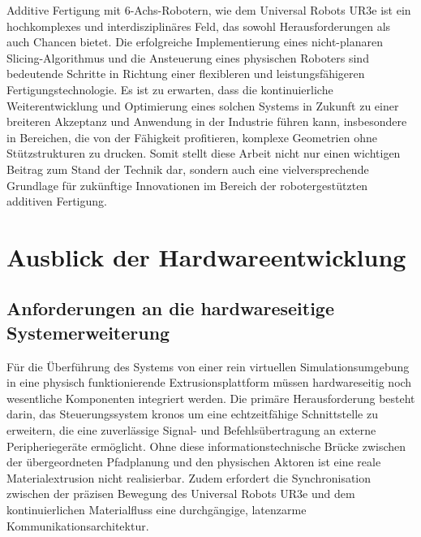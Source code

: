         Additive Fertigung mit 6-Achs-Robotern, wie dem Universal Robots UR3e ist ein hochkomplexes und interdisziplinäres Feld, das sowohl Herausforderungen als auch Chancen bietet.
        Die erfolgreiche Implementierung eines nicht-planaren Slicing-Algorithmus und die Ansteuerung eines physischen Roboters sind bedeutende Schritte in Richtung einer flexibleren und leistungsfähigeren Fertigungstechnologie.
        Es ist zu erwarten, dass die kontinuierliche Weiterentwicklung und Optimierung eines solchen Systems in Zukunft zu einer breiteren Akzeptanz und Anwendung in der Industrie führen kann, insbesondere in Bereichen, die von der Fähigkeit profitieren, komplexe Geometrien ohne Stützstrukturen zu drucken.
        Somit stellt diese Arbeit nicht nur einen wichtigen Beitrag zum Stand der Technik dar, sondern auch eine vielversprechende Grundlage für zukünftige Innovationen im Bereich der robotergestützten additiven Fertigung.

    \section{Ausblick der Hardwareentwicklung}\label{sec:future-of-hardware-development}
        \subsection{Anforderungen an die hardwareseitige Systemerweiterung}
            Für die Überführung des Systems von einer rein virtuellen Simulationsumgebung in eine physisch funktionierende Extrusionsplattform müssen hardwareseitig noch wesentliche Komponenten integriert werden.
            Die primäre Herausforderung besteht darin, das Steuerungssystem \ac{kronos} um eine echtzeitfähige Schnittstelle zu erweitern, die eine zuverlässige Signal- und Befehlsübertragung an externe Peripheriegeräte ermöglicht.
            Ohne diese informationstechnische Brücke zwischen der übergeordneten Pfadplanung und den physischen Aktoren ist eine reale Materialextrusion nicht realisierbar.
            Zudem erfordert die Synchronisation zwischen der präzisen Bewegung des Universal Robots UR3e und dem kontinuierlichen Materialfluss eine durchgängige, latenzarme Kommunikationsarchitektur.

